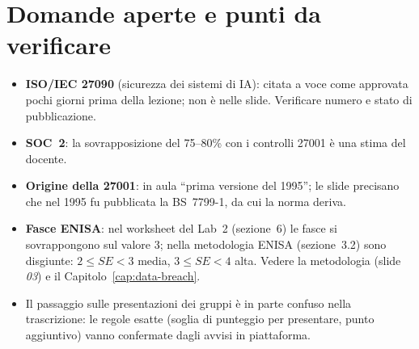 \section{Domande aperte e punti da verificare}
\begin{verifica}
\begin{itemize}
  \item \textbf{ISO/IEC 27090} (sicurezza dei sistemi di IA): citata a voce come approvata pochi giorni
    prima della lezione; non è nelle slide. Verificare numero e stato di pubblicazione.
  \item \textbf{SOC~2}: la sovrapposizione del 75--80\% con i controlli 27001 è una stima del docente.
  \item \textbf{Origine della 27001}: in aula ``prima versione del 1995''; le slide precisano che nel 1995
    fu pubblicata la BS~7799-1, da cui la norma deriva.
  \item \textbf{Fasce ENISA}: nel worksheet del Lab~2 (sezione~6) le fasce si sovrappongono sul valore 3; nella
    metodologia ENISA (sezione~3.2) sono disgiunte: $2 \le SE < 3$ media, $3 \le SE < 4$ alta. Vedere la
    metodologia (slide \emph{03}) e il Capitolo~\ref{cap:data-breach}.
  \item Il passaggio sulle presentazioni dei gruppi è in parte confuso nella trascrizione: le regole esatte
    (soglia di punteggio per presentare, punto aggiuntivo) vanno confermate dagli avvisi in piattaforma.
\end{itemize}
\end{verifica}
